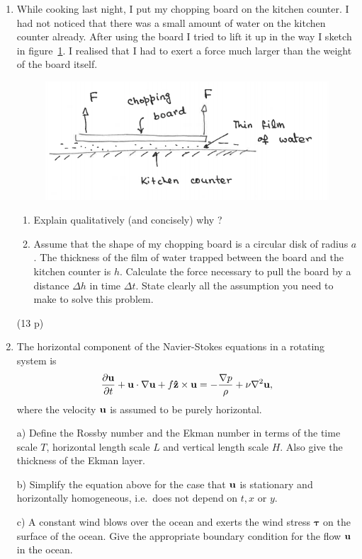 \documentclass[12pt,a4paper]{article}
\newcommand{\bu}{{\bf u}}
\newcommand{\hz}{{\bf\hat{z}}}
\begin{document}
\begin{enumerate}
(12 p) \\


  \item While cooking last night, I put my chopping board on the
    kitchen counter. I had not noticed that there was a small amount
    of water on the kitchen counter already. After using the board I
    tried to lift it up in the way I sketch in
    figure~\ref{fig:board}. I realised that I had to exert a force much
    larger than the weight of the board itself.
  \begin{figure}[h]
    \includegraphics[width=0.5\linewidth]{board.png}
    \label{fig:board}
   \end{figure}
    \begin{enumerate}
    \item Explain qualitatively (and concisely) why ?
    \item Assume that the shape of my chopping board is a circular
      disk of radius $a$. The thickness of the film of
      water trapped between the board and the kitchen counter is $h$.
      Calculate the force necessary to pull the board by a distance
      $\Delta h$ in time $\Delta t$. State clearly all the assumption
      you need to make to solve this problem.
    \end{enumerate}

(13 p)\\


  \item 
The horizontal component of the Navier-Stokes equations in a rotating 
system is
$$
\frac{\partial\bu}{\partial t}+\bu\cdot\nabla\bu+f\hz\times\bu = 
-\frac{\nabla p}{\rho}+\nu\nabla^2 \bu,
$$
where the velocity $\bu$ is assumed to be purely horizontal.

a) Define the Rossby number and the Ekman number in terms of the time
scale $T$, horizontal length scale $L$ and vertical length scale $H$.
Also give the thickness of the Ekman layer.

b) Simplify the equation above for the case that $\bu$ is stationary
and horizontally homogeneous, i.e.\ does not depend on $t, x$ or $y$.

c) A constant wind blows over the ocean and exerts the wind stress
$\bm{\tau}$ on the surface of the ocean. Give the appropriate 
boundary condition for the flow $\bu$ in the ocean.


\end{enumerate}
\end{document}

